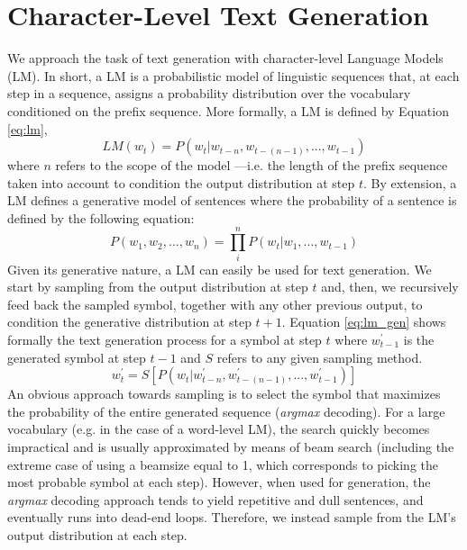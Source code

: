 \documentclass[11pt]{article}
\begin{document}
\section{Character-Level Text Generation}\label{sec:cltg}
We approach the task of text generation with character-level Language Models (LM). In short, a LM is a probabilistic model of linguistic sequences that, at each step in a sequence, assigns a probability distribution over the vocabulary conditioned
on the prefix sequence. More formally, a LM is defined by Equation \ref{eq:lm}, 
\begin{equation}
LM(w_t) = P(w_t|w_{t-n}, w_{t-(n-1)}, ..., w_{t-1})
\label{eq:lm}
\end{equation}
where $n$ refers to the scope of the model ---i.e. the length of the prefix sequence 
taken into account to condition the output distribution at step $t$.  By extension, a LM defines a generative model of sentences where the probability of a sentence is
defined by the following equation:
\begin{equation}
P(w_1, w_2, ..., w_n) = \prod_i^n P(w_t|w_1, ..., w_{t-1})
\label{eq:lm_sent}
\end{equation}
\noindent Given its generative nature, a LM can easily be used for text generation. We start by sampling from the output distribution at step $t$ and, then, we recursively feed back the sampled symbol, together with any other previous output, to condition the generative distribution at
step $t+1$. Equation \ref{eq:lm_gen} shows formally the text generation process for a symbol at
step $t$ where $w_{t-1}^{\prime}$ is the generated symbol at step $t-1$ and $S$ refers
to any given sampling method. 
\begin{equation}
w_{t}^{\prime} = S[P(w_{t}|w_{t-n}^{\prime}, w_{t-(n-1)}^{\prime}, ..., w_{t-1}^{\prime})]
\label{eq:lm_gen}
\end{equation}
\noindent An obvious approach towards sampling is to select the symbol that maximizes the probability of 
the entire generated sequence (\emph{argmax} decoding). For a large vocabulary (e.g. in the
case of a word-level LM), the search quickly becomes impractical and is usually approximated
by means of beam search (including the extreme case of using a beamsize equal to 1, which corresponds
to picking the most probable symbol at each step).
However, when used for generation, the \emph{argmax} decoding approach tends to yield repetitive and dull
sentences, and eventually runs into dead-end loops. Therefore, we instead sample from the LM's output
distribution at each step.
\end{document}

